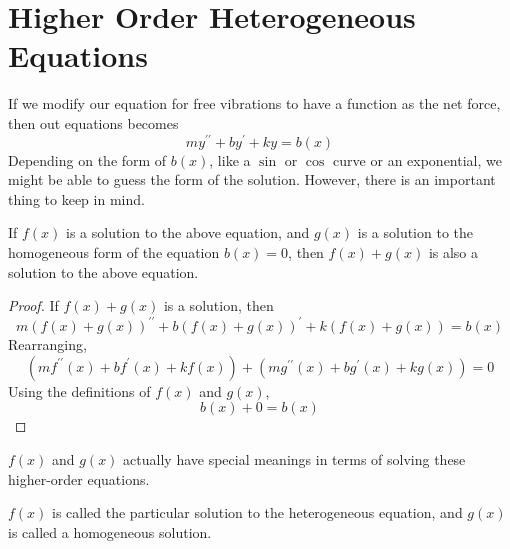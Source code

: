 \section{Higher Order Heterogeneous Equations}
\noindent
If we modify our equation for free vibrations to have a function as the net force, then out equations becomes
\begin{equation*}
	my^{\prime\prime} + by^\prime + ky = b(x)
\end{equation*}
Depending on the form of $b(x)$, like a $\sin$ or $\cos$ curve or an exponential, we might be able to guess the form of the solution. However, there is an important thing to keep in mind.

\begin{theorem}
	If $f(x)$ is a solution to the above equation, and $g(x)$ is a solution to the homogeneous form of the equation $b(x) = 0$, then $f(x) + g(x)$ is also a solution to the above equation.
\end{theorem}
\begin{proof}
	If $f(x) + g(x)$ is a solution, then
	\begin{equation*}
		m\left(f(x) + g(x)\right)^{\prime\prime} + b\left(f(x) + g(x)\right)^\prime + k\left(f(x) + g(x)\right) = b(x)
	\end{equation*}
	Rearranging,
	\begin{equation*}
		\left(mf^{\prime\prime}(x) + bf^{\prime}(x) + kf(x)\right) + \left(mg^{\prime\prime}(x) + bg^{\prime}(x) + kg(x)\right) = 0
	\end{equation*}
	Using the definitions of $f(x)$ and $g(x)$,
	\begin{equation*}
		b(x) + 0 = b(x)
	\end{equation*}
\end{proof}

\noindent
$f(x)$ and $g(x)$ actually have special meanings in terms of solving these higher-order equations.
\begin{definition}
	$f(x)$ is called the particular solution to the heterogeneous equation, and $g(x)$ is called a homogeneous solution.
\end{definition}


